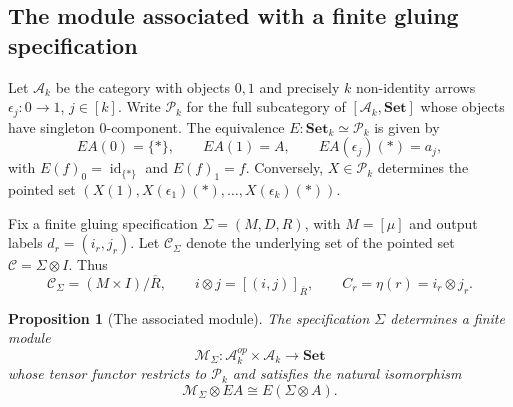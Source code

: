 \documentclass{sn-jnl}%
\theoremstyle{thmstyleone}%
\newtheorem{proposition}[theorem]{Proposition}%
\theoremstyle{thmstyletwo}%
\theoremstyle{thmstylethree}%
\newcommand{\set}{\mathbf{Set}_{k}}
\newcommand{\M}{\Sigma}
\newcommand{\F}{\M\otimes}
\newcommand{\s}{\mu}
\begin{document}
\begin{appendices}
\section{The module associated with a finite gluing specification}
\label{Subsec:RigorousModuleConstruction}

Let $\mathcal A_k$ be the category with objects $0,1$ and precisely $k$ non-identity arrows $\epsilon_j:0\to1$, $j\in[k]$. Write $\mathcal P_k$ for the full subcategory of $[\mathcal A_k,\mathbf{Set}]$ whose objects have singleton $0$-component. The equivalence $E:\set\simeq\mathcal P_k$ is given by
\begin{equation} 
\nonumber
    EA(0)=\{*\},\qquad EA(1)=A,\qquad EA(\epsilon_j)(*)=a_j,
\end{equation}
with $E(f)_0=\operatorname{id}_{\{*\}}$ and $E(f)_1=f$. Conversely, $X\in\mathcal P_k$ determines the pointed set $(X(1),X(\epsilon_1)(*),\ldots,X(\epsilon_k)(*))$.

Fix a finite gluing specification $\Sigma=(M,D,R)$, with $M=[\s]$ and output labels $d_r=(i_r,j_r)$. Let $\mathcal C_\Sigma$ denote the underlying set of the pointed set $\mathcal C=\F I$. Thus
\begin{equation}
\nonumber
    \mathcal C_\Sigma=(M\times I)/\overline R,
    \qquad i\otimes j=[(i,j)]_{\overline R},\qquad C_r=\eta(r)=i_r\otimes j_r.
\end{equation}

\begin{proposition}[The associated module]
\label{Prop:RigorousAssociatedModule}
    The specification $\Sigma$ determines a finite module
    \begin{equation} 
    \nonumber
        \mathcal M_\Sigma:\mathcal A_k^{op}\times\mathcal A_k      \longrightarrow\mathbf{Set}
    \end{equation}
    whose tensor functor restricts to $\mathcal P_k$ and satisfies the natural isomorphism
    \begin{equation} 
    \nonumber
        \mathcal M_\Sigma\otimes EA\cong E(\F A).
    \end{equation}
\end{proposition}


\end{appendices}
\end{document}
